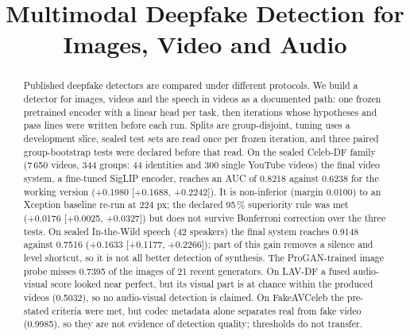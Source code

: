 \documentclass[conference,a4paper]{IEEEtran_nodash}
\newcommand{\papertitle}{Multimodal Deepfake Detection for Images, Video and Audio}
\newcommand{\collegetitlecolour}[1]{#1}
\begin{document}
\title{\collegetitlecolour{\papertitle}}

\author{%
}

\ifcollegestyle
  \collegefrontmatter   %
  \collegestartpaper    %
\fi

\maketitle

\begin{abstract}
Published deepfake detectors are compared under different protocols. We build a detector for images,
videos and the speech in videos as a documented path: one frozen pretrained
encoder with a linear head per task, then iterations whose hypotheses and pass
lines were written before each run. Splits are group-disjoint, tuning uses a
development slice, sealed test sets are read once per frozen iteration, and
three paired group-bootstrap tests were declared before that read. On the sealed
Celeb-DF family (7\,650 videos, 344 groups: 44 identities and 300 single YouTube
videos) the final video system, a fine-tuned SigLIP encoder, reaches an AUC of
0.8218 against 0.6238 for the working version (+0.1980 [+0.1688, +0.2242]). It is
non-inferior (margin 0.0100) to an Xception baseline re-run at 224 px; the
declared 95\,\% superiority rule was met (+0.0176 [+0.0025, +0.0327]) but does
not survive Bonferroni correction over the three tests. On sealed In-the-Wild
speech (42 speakers) the final system reaches 0.9148 against 0.7516 (+0.1633
[+0.1177, +0.2266]); part of this gain removes a silence and level shortcut, so
it is not all better detection of synthesis. The ProGAN-trained image probe
misses 0.7395 of the images of 21 recent generators. On LAV-DF a fused
audio-visual score looked near perfect, but its visual part is at chance within
the produced videos (0.5032), so no audio-visual detection is claimed. On
FakeAVCeleb the pre-stated criteria were met, but codec metadata alone separates
real from fake video (0.9985), so they are not evidence of detection quality;
thresholds do not transfer.
\end{abstract}
\end{document}
